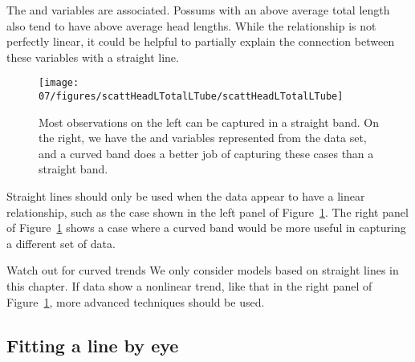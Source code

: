 The  and  variables are associated. Possums with an above average total length also tend to have above average head lengths. While the relationship is not perfectly linear, it could be helpful to partially explain the connection between these variables with a straight line.
\begin{figure}
   \centering
   \texttt{[image: 07/figures/scattHeadLTotalLTube/scattHeadLTotalLTube]}
   \caption{Most observations on the left can be captured in a straight band. On the right, we have the  and  variables represented from the  data set, and a curved band does a better job of capturing these cases than a straight band.}
   \label{scattHeadLTotalLTube}
\end{figure}

Straight lines should only be used when the data appear to have a linear relationship, such as the case shown in the left panel of Figure~\ref{scattHeadLTotalLTube}. The right panel of Figure~\ref{scattHeadLTotalLTube} shows a case where a curved band would be more useful in capturing a different set of data.

\begin{caution}
{Watch out for curved trends}
{We only consider models based on straight lines in this chapter. If data show a nonlinear trend, like that in the right panel of Figure~\ref{scattHeadLTotalLTube}, more advanced techniques should be used.}
\end{caution}

\subsection{Fitting a line by eye}

